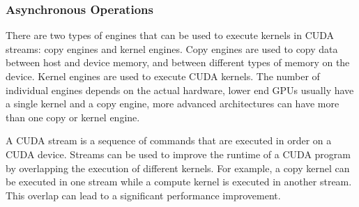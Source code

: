 \documentclass[]{article}
\begin{document}
\begin{figure}[H]
	\begin{center}
	\end{center}
\end{figure}

\subsubsection{Asynchronous Operations} \label{sec:async}

There are two types of engines that can be used to execute kernels in CUDA streams: copy engines and kernel engines. Copy engines are used to copy data between host and device memory, and between different types of memory on the device. Kernel engines are used to execute CUDA kernels. The number of individual engines depends on the actual hardware, lower end GPUs usually have a single kernel and a copy engine, more advanced architectures can have more than one copy or kernel engine.

A CUDA stream is a sequence of commands that are executed in order on a CUDA device. Streams can be used to improve the runtime of a CUDA program by overlapping the execution of different kernels. For example, a copy kernel can be executed in one stream while a compute kernel is executed in another stream. This overlap can lead to a significant performance improvement.
\end{document}
